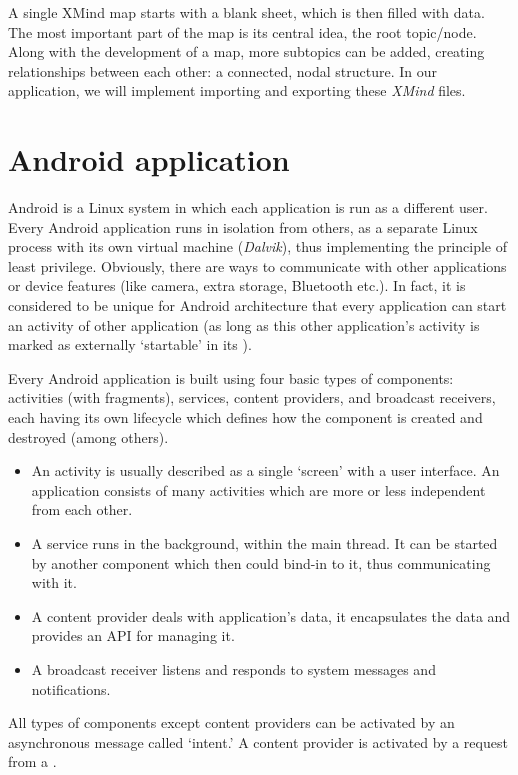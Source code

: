 A single XMind map starts with a blank sheet, which is then filled with data. The most important part of the map is its central idea, the root topic/node. Along with the development of a map, more subtopics can be added, creating relationships between each other: a connected, nodal structure. In our application, we will implement importing and exporting these {\em XMind} files.

\section{Android application}
\label{sec:android-theory}

Android is a Linux system in which each application is run as a different user. Every Android application runs in isolation from others, as a separate Linux process with its own virtual machine ({\em Dalvik}), thus implementing the principle of least privilege. Obviously, there are ways to communicate with other applications or device features (like camera, extra storage, Bluetooth etc.). In fact, it is considered to be unique for Android architecture that every application can start an activity of other application (as long as this other application's activity is marked as externally `startable' in its ).

Every Android application is built using four basic types of components: activities (with fragments), services, content providers, and broadcast receivers, each having its own lifecycle which defines how the component is created and destroyed (among others).

\begin{itemize}
	\item An activity is usually described as a single `screen' with a user interface. An application consists of many activities which are more or less independent from each other.
	\item A service runs in the background, within the main thread. It can be started by another component which then could bind-in to it, thus communicating with it.
	\item A content provider deals with application's data, it encapsulates the data and provides an API for managing it.
	\item A broadcast receiver listens and responds to system messages and notifications.
\end{itemize}

All types of components except content providers can be activated by an asynchronous message called `intent.' A content provider is activated by a request from a .

